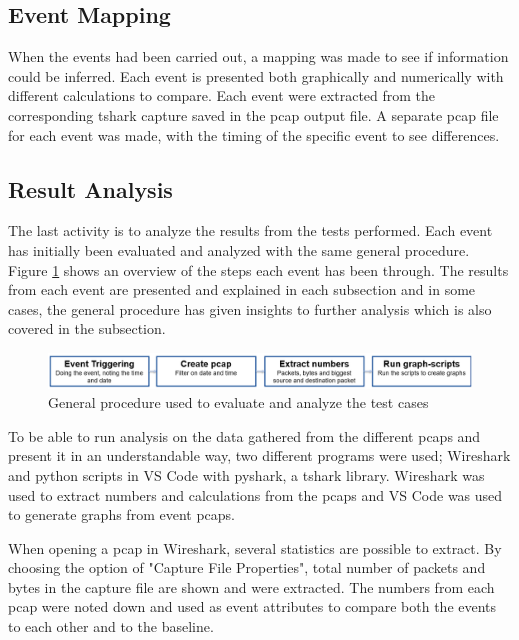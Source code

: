 \subsection{Event Mapping}
When the events had been carried out, a mapping was made to see if information could be inferred. Each event is presented both graphically and numerically with different calculations to compare. Each event were extracted from the corresponding tshark capture saved in the pcap output file. A separate pcap file for each event was made, with the timing of the specific event to see differences. 

\subsection{Result Analysis}
The last activity is to analyze the results from the tests performed. Each event has initially been evaluated and analyzed with the same general procedure. Figure \ref{fig:GeneralProcedure} shows an overview of the steps each event has been through. The results from each event are presented and explained in each subsection and in some cases, the general procedure has given insights to further analysis which is also covered in the subsection.

\begin{figure}[H]
    \centering
    \includegraphics[width=\textwidth]{figures/GeneralProcedure.png}
    \caption{General procedure used to evaluate and analyze the test cases}
    \label{fig:GeneralProcedure}
\end{figure}

To be able to run analysis on the data gathered from the different \gls{pcaps} and present it in an understandable way, two different programs were used; Wireshark and python scripts in \gls{VS Code} with pyshark, a tshark library. Wireshark was used to extract numbers and calculations from the pcaps and \gls{VS Code} was used to generate graphs from event \gls{pcaps}.

When opening a pcap in Wireshark, several statistics are possible to extract. By choosing the option of "Capture File Properties", total number of packets and bytes in the capture file are shown and were extracted. The numbers from each pcap were noted down and used as event attributes to compare both the events to each other and to the baseline. 

